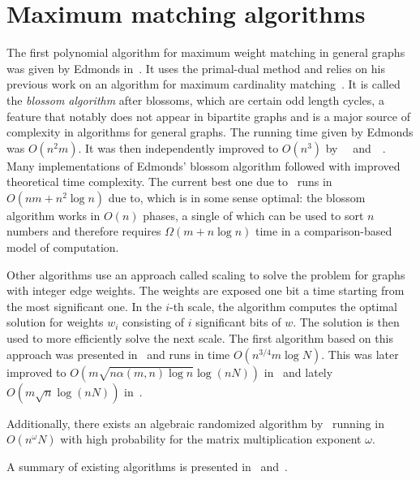 \section{Maximum matching algorithms}

The first polynomial algorithm for maximum weight matching in general graphs was given by Edmonds in~\cite{edmonds1965maximum}. It uses the primal-dual method and relies on his previous work on an algorithm for maximum cardinality matching~\cite{edmonds1965paths}. It is called the \emph{blossom algorithm} after blossoms, which are certain odd length cycles, a feature that notably does not appear in bipartite graphs and is a major source of complexity in algorithms for general graphs. The running time given by Edmonds was $O(n^2m)$. It was then independently improved to $O(n^3)$ by~\citeauthor*{lawler2001combinatorial}~\cite{lawler2001combinatorial} and~\citeauthor*{gabow1974implementation}~\cite{gabow1974implementation}. Many implementations of Edmonds' blossom algorithm followed with improved theoretical time complexity. The current best one due to~\cite{gabow1990data} runs in $O(nm + n^2 \log n)$ due to, which is in some sense optimal: the blossom algorithm works in $O(n)$ phases, a single of which can be used to sort $n$ numbers and therefore requires $\Omega(m + n \log n)$ time in a comparison-based model of computation. 

Other algorithms use an approach called scaling to solve the problem for graphs with integer edge weights. The weights are exposed one bit a time starting from the most significant one. In the $i$-th scale, the algorithm computes the optimal solution for weights $w_i$ consisting of $i$ significant bits of $w$. The solution is then used to more efficiently solve the next scale. The first algorithm based on this approach was presented in~\cite{gabow1984efficient} and runs in time $O(n^{3/4}m \log N)$. This was later improved to $O(m \sqrt{n\alpha(m, n) \log n} \log(nN))$ in~\cite{gabow1991faster} and lately $O(m \sqrt{n} \log(nN))$ in~\cite{duan2018scaling}. 

Additionally, there exists an algebraic randomized algorithm by~\cite{cygan2015algorithmic} running in $O(n^\omega N)$ with high probability for the matrix multiplication exponent $\omega$.

A summary of existing algorithms is presented in~ and~.

